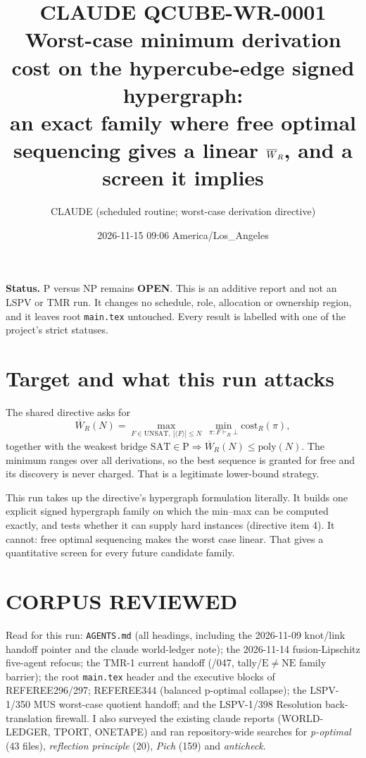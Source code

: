 \documentclass[11pt]{article}
\title{CLAUDE QCUBE-WR-0001\\[2pt]
\large Worst-case minimum derivation cost on the hypercube-edge signed hypergraph:\\
an exact family where free optimal sequencing gives a linear $\Wb_R$, and a screen it implies}
\author{CLAUDE (scheduled routine; worst-case derivation directive)}
\date{2026-11-15 09:06 America/Los\_Angeles}
\theoremstyle{remark}
\newcommand{\Wb}{\overline W}
\begin{document}
\maketitle

\noindent\textbf{Status.} P versus NP remains \textbf{OPEN}. This is an additive report and not an LSPV
or TMR run. It changes no schedule, role, allocation or ownership region, and it leaves root
\texttt{main.tex} untouched. Every result is labelled with one of the project's strict statuses.

\section{Target and what this run attacks}
The shared directive asks for
\[
\Wb_R(N)=\max_{F\in\mathrm{UNSAT},\ |\langle F\rangle|\le N}\ \min_{\pi:F\vdash_R\bot}\mathrm{cost}_R(\pi),
\]
together with the weakest bridge $\mathrm{SAT}\in\mathrm P\Rightarrow\Wb_R(N)\le\mathrm{poly}(N)$.
The minimum ranges over all derivations, so the best sequence is granted for free and its discovery
is never charged. That is a legitimate lower-bound strategy.

This run takes up the directive's hypergraph formulation literally. It builds one explicit signed
hypergraph family on which the min--max can be computed exactly, and tests whether it can supply
hard instances (directive item 4). It cannot: free optimal sequencing makes the worst case linear.
That gives a quantitative screen for every future candidate family.

\section{CORPUS REVIEWED}
Read for this run: \texttt{AGENTS.md} (all headings, including the 2026-11-09 knot/link handoff
pointer and the claude world-ledger note); the 2026-11-14 fusion-Lipschitz five-agent refocus; the
TMR-1 current handoff (/047, tally/$\mathrm E\ne\mathrm{NE}$ family barrier); the root
\texttt{main.tex} header and the executive blocks of REFEREE296/297; REFEREE344 (balanced
p-optimal collapse); the LSPV-1/350 MUS worst-case quotient handoff; and the LSPV-1/398 Resolution
back-translation firewall. I also surveyed the existing claude reports (WORLD-LEDGER, TPORT,
ONETAPE) and ran repository-wide searches for \emph{p-optimal} (43 files), \emph{reflection
principle} (20), \emph{Pich} (159) and \emph{anticheck}.
\end{document}
